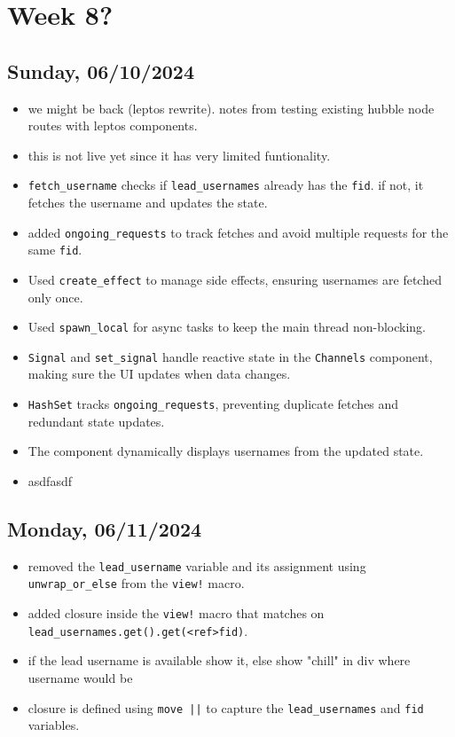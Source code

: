 \newpage
\section{Week 8?}
\subsection*{Sunday, 06/10/2024}
\begin{itemize}
    \item we might be back (leptos rewrite). notes from testing existing hubble
        node routes with leptos components.
    \item this is not live yet since it has very limited funtionality.
    \item \texttt{fetch_username} checks if \texttt{lead_usernames} already 
        has the \texttt{fid}. if not, it fetches the username and updates the 
        state.
    \item added \texttt{ongoing_requests} to track fetches and avoid multiple 
        requests for the same \texttt{fid}.
    \item Used \texttt{create_effect} to manage side effects, ensuring 
        usernames are fetched only once.
    \item Used \texttt{spawn_local} for async tasks to keep the main thread 
        non-blocking.
    \item \texttt{Signal} and \texttt{set_signal} handle reactive state in the 
        \texttt{Channels} component, making sure the UI updates when data 
        changes.
    \item \texttt{HashSet} tracks \texttt{ongoing_requests}, preventing 
        duplicate fetches and redundant state updates.
    \item The component dynamically displays usernames from the updated state.
    \item asdfasdf
\end{itemize}

\subsection*{Monday, 06/11/2024}
\begin{itemize}
    \item removed the \texttt{lead_username} variable and its assignment using 
        \texttt{unwrap_or_else} from the \texttt{view!} macro.
    \item added closure inside the \texttt{view!} macro that matches on\\ 
        \texttt{lead_usernames.get().get(<ref>fid)}.
    \item if the lead username is available show it, else show "chill" in div
        where username would be 
    \item closure is defined using \texttt{move ||} to capture the 
        \texttt{lead_usernames} and \texttt{fid} variables.
\end{itemize}

